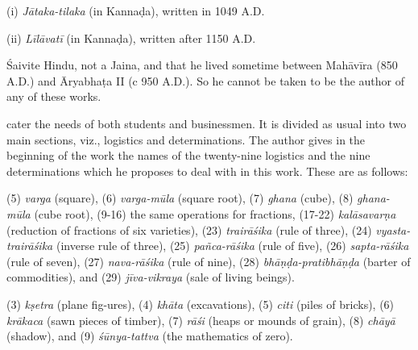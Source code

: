 \documentclass[10pt, openany]{book}
\begin{document}
{\vspace{0.2cm} {(i) \textit{Jātaka-tilaka} (in Kannaḍa), written in 1049 A.D.}

 {(ii) \textit{Līlāvatī} (in Kannaḍa), written after 1150 A.D.}

\newpage


\vspace{0.3cm}{But we have shown below that Śrīdharācārya was a}
{Śaivite Hindu, not a Jaina, and that he lived sometime between Mahāvīra (850 A.D.) and Āryabhaṭa II (c 950 A.D.).}
{So he cannot be taken to be the author of any of these works.}

{cater the needs of both students and businessmen. It is}
{divided as usual into two main sections, viz., logistics and}
{determinations. The author gives in the beginning of the}
{work the names of the twenty-nine logistics and the nine}
{determinations which he proposes to deal with in this work.}
{These are as follows:}

{(5)\textit{ varga} (square), (6)\textit{ varga-mūla} (square root), (7) \textit{ghana}}
{(cube), (8) \textit{ghana-mūla} (cube root), (9-16) the same operations}
{for fractions, (17-22)\textit{ kalāsavarṇa} (reduction of fractions of six}
varieties), (23) \textit{trairāśika }(rule of three), (24)
\textit{vyasta-trairāśika}
{(inverse rule of three), (25)\textit{ pañca-rāśika} (rule of five), (26)}
{\textit{sapta-rāśika }(rule of seven), (27) \textit{nava-rāśika }(rule of nine),
(28)}
{\textit{bhāṇḍa-pratibhāṇḍa} (barter of commodities), and (29) \textit{jīva-vikraya}}
{(sale of living beings).}

{(3)\textit{ kṣetra} (plane fig-ures), (4)\textit{ khāta} (excavations), (5)
\textit{citi }(piles}
{of bricks), (6) \textit{krākaca }(sawn pieces of timber), (7)\textit{ rāśi}
(heaps}
{or mounds of grain), (8) \textit{chāyā }(shadow), and (9)\textit{ śūnya-tattva}}
{(the mathematics of zero).}

}
\end{document}
